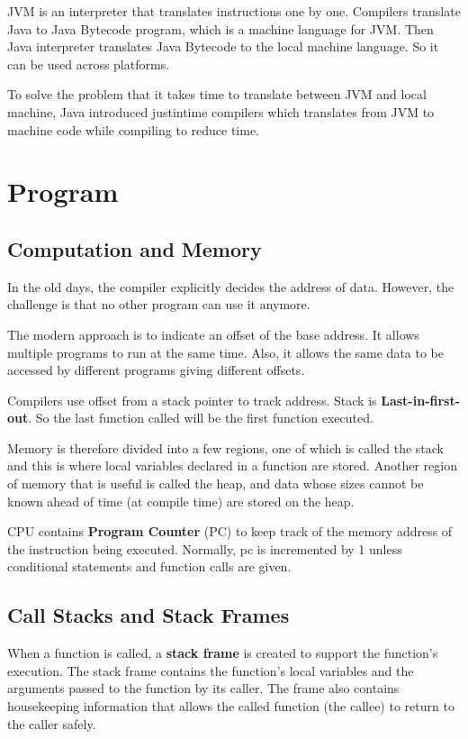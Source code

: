 \documentclass[letterpaper,12pt]{article}
\begin{document}
JVM is an interpreter that translates instructions one by one. Compilers translate Java to Java Bytecode program, which is a machine language for JVM. Then Java interpreter translates Java Bytecode to the local machine language. So it can be used across platforms.

To solve the problem that it takes time to translate between JVM and local machine, Java introduced just\-in\-time compilers which translates from JVM to machine code while compiling to reduce time.
\section{Program}

\subsection{Computation and Memory}

In the old days, the compiler explicitly decides the address of data. However, the challenge is that no other program can use it anymore.

The modern approach is to indicate an offset of the base address. It allows multiple programs to run at the same time. Also, it allows the same data to be accessed by different programs giving different offsets.

Compilers use offset from a stack pointer to track address. Stack is \textbf{Last-in-first-out}. So the last function called will be the first function executed.

Memory is therefore divided into a few regions, one of which is called the stack and this is where local variables declared in a function are stored. Another region of memory that is useful is called the heap, and data whose sizes cannot be known ahead of time (at compile time) are stored on the heap.

CPU contains \textbf{Program Counter} (PC) to keep track of the memory address
of the instruction being executed. Normally, pc is incremented by 1 unless
conditional statements and function calls are given.

\subsection{Call Stacks and Stack Frames}

When a function is called, a \textbf{stack frame} is created to support the function's execution. The stack frame contains the function's local variables and the arguments passed to the function by its caller. The frame also contains housekeeping information that allows the called function (the callee) to return to the caller safely.
\end{document}
